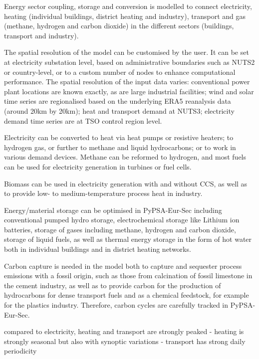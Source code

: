 Energy sector coupling, storage and conversion is modelled to connect
electricity, heating (individual buildings, district heating and industry),
transport and gas (methane, hydrogen and carbon dioxide) in the different
sectors (buildings, transport and industry).

The spatial resolution of the model can be customised by the user. It can be set
at electricity substation level, based on administrative boundaries such as
NUTS2 or country-level, or to a custom number of nodes to enhance computational
performance. The spatial resolution of the input data varies: conventional power
plant locations are known exactly, as are large industrial facilities; wind and
solar time series are regionalised based on the underlying ERA5 reanalysis data
(around 20km by 20km); heat and transport demand at NUTS3; electricity demand
time series are at TSO control region level.

Electricity can be converted to heat via heat pumps or resistive heaters; to
hydrogen gas, or further to methane and liquid hydrocarbons; or to work in
various demand devices. Methane can be reformed to hydrogen, and most fuels can
be used for electricity generation in turbines or fuel cells.

Biomass can be used in electricity generation with and
without CCS, as well as to provide low- to medium-temperature process heat in
industry.

Energy/material storage can be optimised in PyPSA-Eur-Sec including conventional
pumped hydro storage, electrochemical storage like Lithium ion batteries,
storage of gases including methane, hydrogen and carbon dioxide, storage of
liquid fuels, as well as thermal energy storage in the form of hot water both in
individual buildings and in district heating networks.

Carbon capture is
needed in the model both to capture and sequester process emissions with a
fossil origin, such as those from calcination of fossil limestone in the cement
industry, as well as to provide carbon for the production of hydrocarbons for
dense transport fuels and as a chemical feedstock, for example for the plastics
industry. Therefore, carbon cycles are carefully tracked in PyPSA-Eur-Sec.

compared to electricity, heating and transport are strongly peaked
- heating is strongly seasonal but also with synoptic variations
- transport has strong daily periodicity